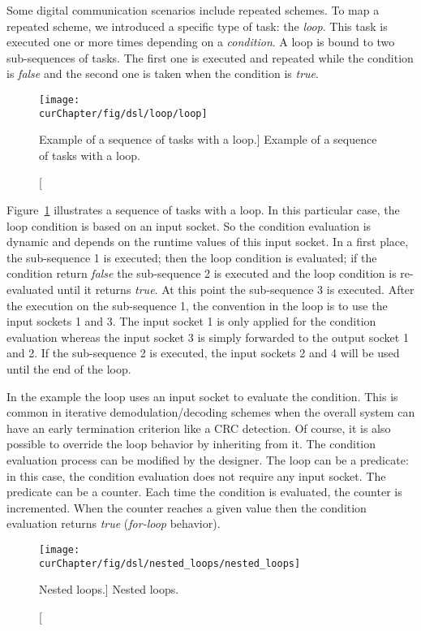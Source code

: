 Some digital communication scenarios include repeated schemes. To map a repeated
scheme, we introduced a specific type of task: the \emph{loop}. This task is
executed one or more times depending on a \emph{condition}. A loop is bound to
two sub-sequences of tasks. The first one is executed and repeated while the
condition is \emph{false} and the second one is taken when the condition is
\emph{true}.

\begin{figure}[htp]
  \centering
  \texttt{[image: \\curChapter/fig/dsl/loop/loop]}
  \caption
    [Example of a sequence of tasks with a loop.]
    {Example of a sequence of tasks with a loop.}
  \label{fig:sdr_dsl_loop}
\end{figure}

Figure~\ref{fig:sdr_dsl_loop} illustrates a sequence of tasks with a loop. In
this particular case, the loop condition is based on an input socket. So the
condition evaluation is dynamic and depends on the runtime values of this input
socket. In a first place, the sub-sequence 1 is executed; then the loop
condition is evaluated; if the condition return \emph{false} the sub-sequence 2
is executed and the loop condition is re-evaluated until it returns \emph{true}.
At this point the sub-sequence 3 is executed. After the execution on the
sub-sequence 1, the convention in the loop is to use the input sockets 1 and 3.
The input socket 1 is only applied for the condition evaluation whereas the
input socket 3 is simply forwarded to the output socket 1 and 2. If the
sub-sequence 2 is executed, the input sockets 2 and 4 will be used until the end
of the loop.

In the example the loop uses an input socket to evaluate the condition. This is
common in iterative demodulation/decoding schemes when the overall system can
have an early termination criterion like a CRC detection. Of course, it is also
possible to override the loop behavior by inheriting from it. The condition
evaluation process can be modified by the designer. The loop can be a predicate:
in this case, the condition evaluation does not require any input socket. The
predicate can be a counter. Each time the condition is evaluated, the counter is
incremented. When the counter reaches a given value then the condition
evaluation returns \emph{true} (\emph{for-loop} behavior).

\begin{figure}[htp]
  \centering
  \texttt{[image: \\curChapter/fig/dsl/nested\_loops/nested\_loops]}
  \caption
    [Nested loops.]
    {Nested loops.}
  \label{fig:sdr_dsl_nested_loop}
\end{figure}


